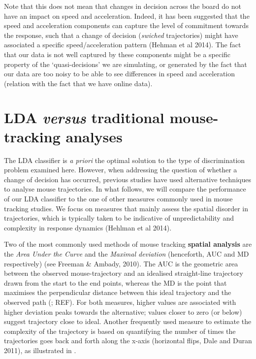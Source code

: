 \documentclass{article}
\newcommand{\addMM}[1]{{\leavevmode\color{red}#1}}
\begin{document}
Note that this does not mean that changes in decision across the board do not have an impact on speed and acceleration. Indeed, it has been suggested that the speed and acceleration components can capture the level of commitment towards the response, such that a change of decision (\textit{swiched} trajectories) might have associated a specific speed/acceleration pattern (Hehman et al 2014). 
\addMM{The fact that our data is not well captured by these components might be a specific property of the `quasi-decisions' we are simulating, or generated by the fact that our data are too noisy to be able to see differences in speed and acceleration (relation with the fact that we have online data).}


\section{LDA \emph{versus} traditional mouse-tracking analyses}
The LDA classifier is \emph{a priori} the optimal solution to the type of discrimination problem examined here. However, when addressing the question of whether a change of decision has occurred, previous studies have used alternative techniques to analyse mouse trajectories. In what follows, we will compare the performance of our LDA classifier to the one of other measures commonly used in mouse tracking studies. We focus on measures that mainly assess the spatial disorder in trajectories, which is typically taken to be indicative of unpredictability and complexity in response dynamics (Hehlman et al 2014). 

Two of the most commonly used methods of mouse tracking \textbf{spatial analysis} are the \textit{Area Under the Curve} and the \textit{Maximal deviation} (henceforth, AUC and MD respectively) (see Freeman \& Ambady, 2010).  
The AUC is the geometric area between the observed mouse-trajectory and an idealised straight-line trajectory drawn from the start to the end points, whereas the MD is the point that maximises the perpendicular distance between this ideal trajectory and the observed path
(; REF). For both measures, higher values are associated with higher deviation peaks towards the alternative; values closer to zero (or below) suggest trajectory close to ideal. 
Another frequently used measure to estimate the complexity of the trajectory is based on quantifying the number of times the trajectories goes back and forth along the x-axis (horizontal flips, Dale and Duran 2011), as illustrated in .
\end{document}
